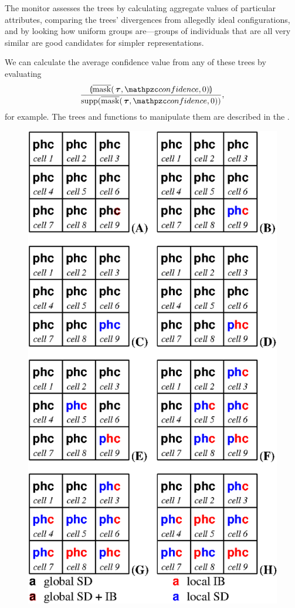 The monitor assesses the trees by calculating aggregate values of
particular attributes, comparing the trees' divergences from allegedly
ideal con\-fig\-ur\-a\-tions, and by looking how uniform groups are---groups
of in\-di\-vidu\-als that are all very similar are good candidates for
simpler rep\-re\-sen\-ta\-tions. 

We can calculate the average confidence value from any of these trees
by evaluating \[
\frac{\nabs{\nmask(\node{\tau},
    \mc{confidence},0)}}{\supp(\nmask(\node{\tau},
  \mc{confidence},0))},
\]
for example. The trees and functions to manipulate them are described
in the \appendixname.



\begin{figure}\label{timeline}
\begin{center}
  \includegraphics{Figure3}

\end{center}
\end{figure}
